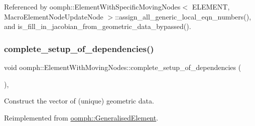 Referenced by oomph\+::\+Element\+With\+Specific\+Moving\+Nodes$<$ E\+L\+E\+M\+E\+N\+T, Macro\+Element\+Node\+Update\+Node $>$\+::assign\+\_\+all\+\_\+generic\+\_\+local\+\_\+eqn\+\_\+numbers(), and is\+\_\+fill\+\_\+in\+\_\+jacobian\+\_\+from\+\_\+geometric\+\_\+data\+\_\+bypassed().

\mbox{\label{classoomph_1_1ElementWithMovingNodes_a6d2fa178f36d4b8413a9ce4f24e9c87e}} 
\subsubsection{\texorpdfstring{complete\+\_\+setup\+\_\+of\+\_\+dependencies()}{complete\_setup\_of\_dependencies()}}
{\footnotesize\ttfamily void oomph\+::\+Element\+With\+Moving\+Nodes\+::complete\+\_\+setup\+\_\+of\+\_\+dependencies (\begin{DoxyParamCaption}{ }\end{DoxyParamCaption})\hspace{0.3cm}{\ttfamily [protected]}, {\ttfamily [virtual]}}



Construct the vector of (unique) geometric data. 



Reimplemented from \hyperlink{classoomph_1_1GeneralisedElement_af03c43b9df873659a6ca91e39566256e}{oomph\+::\+Generalised\+Element}.



